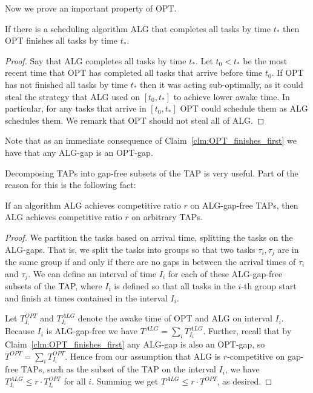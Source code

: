 Now we prove an important property of OPT.
\begin{claim}
  \label{clm:OPT_finishes_first}
  If there is a scheduling algorithm ALG that completes all tasks by
  time $t_*$ then OPT finishes all tasks by time $t_*$.
\end{claim}
\begin{proof}
  Say that ALG completes all tasks by time $t_*$. Let $t_0 < t_*$
  be the most recent time that OPT has completed all tasks that
  arrive before time $t_0$. If OPT has not finished all tasks by
  time $t_*$ then it was acting sub-optimally, as it could steal
  the strategy that ALG used on $[t_0, t_*]$ to achieve lower
  awake time. In particular, for any tasks that arrive in $[t_0,
  t_*]$ OPT could schedule them as ALG schedules them. We remark
  that OPT should not steal all of ALG. 
\end{proof}
Note that as an immediate consequence of Claim~\ref{clm:OPT_finishes_first}
we have that any ALG-gap is an OPT-gap.

Decomposing TAPs into gap-free subsets of the TAP is very useful.
Part of the reason for this is the following fact:
\begin{claim}
  \label{clm:just_consider_gapless}
  If an algorithm ALG achieves competitive ratio $r$ on
  ALG-gap-free TAPs, then ALG achieves 
  competitive ratio $r$ on arbitrary TAPs.
\end{claim}
\begin{proof}
  We partition the tasks based on arrival time, splitting the
  tasks on the ALG-gaps. That is, we split the tasks into groups
  so that two tasks $\tau_i, \tau_j$ are in the same group if and
  only if there are no gaps in between the arrival times of
  $\tau_i$ and $\tau_j$.
  We can define an interval of time $I_i$ for each of these
  ALG-gap-free subsets of the TAP, where $I_i$ is defined so that
  all tasks in the $i$-th group start and finish at times
  contained in the interval $I_i$.

  Let $T_{I_i}^{OPT}$ and $T_{I_i}^{ALG}$ denote the awake time
  of OPT and ALG on interval $I_i$. Because $I_i$ is ALG-gap-free
  we have $T^{ALG} = \sum_{i} T^{ALG}_{I_i}$.
  Further, recall that by Claim~\ref{clm:OPT_finishes_first} any
  ALG-gap is also an OPT-gap, so
  $T^{OPT} = \sum_{i} T_{I_i}^{OPT}$. 
  Hence from our assumption that ALG is $r$-competitive on
  gap-free TAPs, such as the subset of the TAP on the interval
  $I_i$, we have $T_{I_i}^{ALG} \le r\cdot T_{I_i}^{OPT}$ for
  all $i$. Summing we get $T^{ALG} \le r\cdot T^{OPT}$, as desired.
  
\end{proof}

